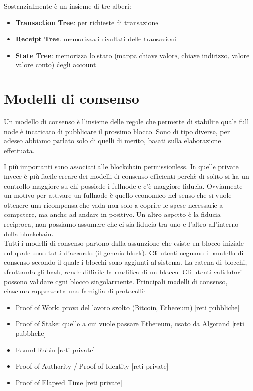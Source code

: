 Sostanzialmente è un insieme di tre alberi:
\begin{itemize}
    \item \textbf{Transaction Tree}: per richieste di transazione
    \item \textbf{Receipt Tree}: memorizza i risultati delle transazioni
    \item \textbf{State Tree}: memorizza lo stato (mappa chiave valore, chiave indirizzo, valore valore conto) degli account
\end{itemize}

\section{Modelli di consenso}
Un modello di consenso è l'insieme delle regole che permette di stabilire quale full node è incaricato di pubblicare il prossimo blocco. Sono di tipo diverso, per adesso abbiamo parlato solo di quelli di merito, basati sulla elaborazione effettuata. 

I più importanti sono associati alle blockchain permissionless. In quelle private invece è più facile creare dei modelli di consenso efficienti perchè di solito si ha un controllo maggiore su chi possiede i fullnode e c'è maggiore fiducia. Ovviamente un motivo per attivare un fullnode è quello economico nel senso che si vuole ottenere una ricompensa che vada non solo a coprire le spese necessarie a competere, ma anche ad andare in positivo. Un altro aspetto è la fiducia reciproca, non possiamo assumere che ci sia fiducia tra uno e l'altro all'interno della blockchain. \\

Tutti i modelli di consenso partono dalla assunzione che esiste un blocco iniziale sul quale sono tutti d'accordo (il genesis block). Gli utenti seguono il modello di consenso secondo il quale i blocchi sono aggiunti al sistema. La catena di blocchi, sfruttando gli hash, rende difficile la modifica di un blocco. Gli utenti validatori possono validare ogni blocco singolarmente. Principali modelli di consenso, ciascuno rappresenta una famiglia di protocolli:
\begin{itemize}
    \item Proof of Work: prova del lavoro svolto (Bitcoin, Ethereum) [reti pubbliche]
    \item Proof of Stake: quello a cui vuole passare Ethereum, usato da Algorand [reti pubbliche]
    \item Round Robin [reti private]
    \item Proof of Authority / Proof of Identity [reti private]
    \item Proof of Elapsed Time [reti private]
\end{itemize}

